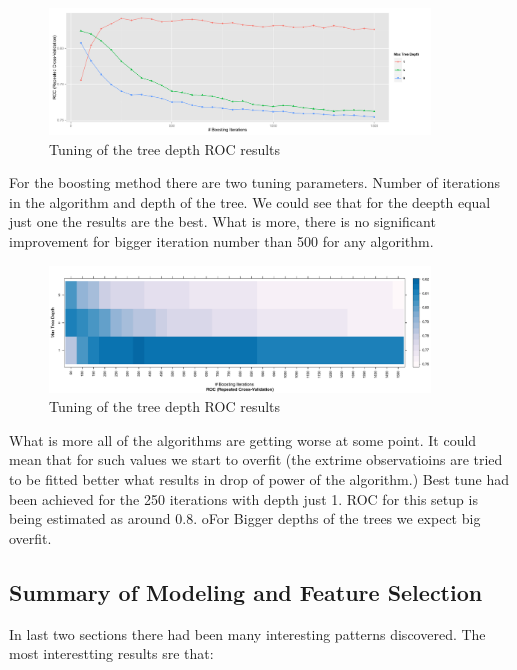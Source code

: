\documentclass[10pt]{article}\usepackage[]{graphicx}\usepackage[]{color}
\begin{document}
\clearpage 

\begin{figure}[h!]
  \centering
  \includegraphics[width=0.9\textwidth]{Plots/TUNE_GBM}
  \caption
   {Tuning of the tree depth ROC results}
\end{figure}

For the boosting method there are two tuning parameters. Number of iterations in the algorithm and depth of the tree. We could see that for the deepth equal just one the results are the best. What is more, there is no significant improvement for bigger  iteration number than 500 for any algorithm. 

\begin{figure}[h!]
  \centering
  \includegraphics[width=0.9\textwidth]{Plots/TUNE_GBM_1}
  \caption
   {Tuning of the tree depth ROC results}
\end{figure}
What is more all of the algorithms are getting worse at some point. It could mean that for such values we start to overfit (the extrime observatioins are tried to be fitted better what results in drop of power of the algorithm.)
Best tune had been achieved for the 250 iterations with depth just 1. ROC for this setup is being estimated as around 0.8. oFor Bigger depths of the trees we expect big overfit. 

\clearpage

\subsection{Summary of Modeling and Feature Selection}

In last two sections there had been many interesting patterns discovered. The most interestting results sre that:
\end{document}
